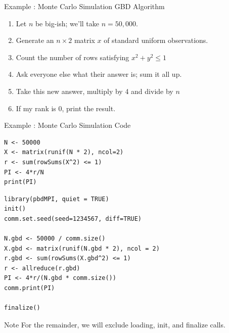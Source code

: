 \begin{frame}[fragile]
  \begin{block}{Example \showex :  Monte Carlo Simulation GBD Algorithm}\pause
    \begin{enumerate}
     \item Let $n$ be big-ish; we'll take $n=50,000$.
     \item Generate an $n\times 2$ matrix $x$ of standard uniform observations.
     \item Count the number of rows satisfying $x^2 + y^2 \leq 1$
     \item Ask everyone else what their answer is; sum it all up.
     \item Take this new answer, multiply by 4 and divide by $n$
     \item If my rank is 0, print the result.
    \end{enumerate}
  \end{block}
\end{frame}


\begin{frame}
  \begin{exampleblock}{Example \showex :  Monte Carlo Simulation Code}\pause
\begin{lstlisting}[title=Serial Code]
N <- 50000
X <- matrix(runif(N * 2), ncol=2)
r <- sum(rowSums(X^2) <= 1)
PI <- 4*r/N
print(PI)
\end{lstlisting}

\begin{lstlisting}[title=Parallel Code]
library(pbdMPI, quiet = TRUE)
init()
comm.set.seed(seed=1234567, diff=TRUE)

N.gbd <- 50000 / comm.size()
X.gbd <- matrix(runif(N.gbd * 2), ncol = 2)
r.gbd <- sum(rowSums(X.gbd^2) <= 1)
r <- allreduce(r.gbd)
PI <- 4*r/(N.gbd * comm.size())
comm.print(PI)

finalize()
\end{lstlisting}
  \end{exampleblock}
\end{frame}

\begin{frame}[fragile]
  \begin{block}{Note}\pause
    For the remainder, we will exclude loading, init, and finalize calls.
  \end{block}
\end{frame}



